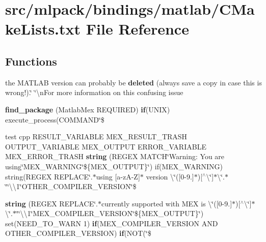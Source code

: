 \section{src/mlpack/bindings/matlab/\+C\+Make\+Lists.txt File Reference}
\label{bindings_2matlab_2CMakeLists_8txt}
\subsection*{Functions}
\begin{DoxyCompactItemize}
\item 
the M\+A\+T\+L\+AB version can probably be {\bf deleted} (always save a copy in case this is wrong!).\char`\"{} \char`\"{}\textbackslash{}n\+For more information on this confusing issue
\item 
{\bf find\+\_\+package} (Matlab\+Mex R\+E\+Q\+U\+I\+R\+ED) {\bf if}(U\+N\+IX) execute\+\_\+process(C\+O\+M\+M\+A\+ND\char`\"{}\$
\item 
test cpp R\+E\+S\+U\+L\+T\+\_\+\+V\+A\+R\+I\+A\+B\+LE M\+E\+X\+\_\+\+R\+E\+S\+U\+L\+T\+\_\+\+T\+R\+A\+SH O\+U\+T\+P\+U\+T\+\_\+\+V\+A\+R\+I\+A\+B\+LE M\+E\+X\+\_\+\+O\+U\+T\+P\+UT E\+R\+R\+O\+R\+\_\+\+V\+A\+R\+I\+A\+B\+LE M\+E\+X\+\_\+\+E\+R\+R\+O\+R\+\_\+\+T\+R\+A\+SH {\bf string} (R\+E\+G\+EX M\+A\+T\+CH\char`\"{}Warning\+: You are using\char`\"{}M\+E\+X\+\_\+\+W\+A\+R\+N\+I\+NG\char`\"{}\$\{M\+E\+X\+\_\+\+O\+U\+T\+P\+UT\}\char`\"{}) if(M\+E\+X\+\_\+\+W\+A\+R\+N\+I\+NG) string(R\+E\+G\+EX R\+E\+P\+L\+A\+CE\char`\"{}.$\ast$using [a-\/zA-\/Z]$\ast$ version \textbackslash{}\char`\"{}([0-\/9.]$\ast$)[$^\wedge$\textbackslash{}\char`\"{}]$\ast$\textbackslash{}\char`\"{}.$\ast$\char`\"{}\char`\"{}\textbackslash{}\textbackslash{}1\char`\"{}O\+T\+H\+E\+R\+\_\+\+C\+O\+M\+P\+I\+L\+E\+R\+\_\+\+V\+E\+R\+S\+I\+ON\char`\"{}\$
\item 
{\bf string} (R\+E\+G\+EX R\+E\+P\+L\+A\+CE\char`\"{}.$\ast$currently supported with M\+EX is \textbackslash{}\char`\"{}([0-\/9.]$\ast$)[$^\wedge$\textbackslash{}\char`\"{}]$\ast$\textbackslash{}\char`\"{}.$\ast$\char`\"{}\char`\"{}\textbackslash{}\textbackslash{}1\char`\"{}M\+E\+X\+\_\+\+C\+O\+M\+P\+I\+L\+E\+R\+\_\+\+V\+E\+R\+S\+I\+ON\char`\"{}\$\{M\+E\+X\+\_\+\+O\+U\+T\+P\+UT\}\char`\"{}) set(N\+E\+E\+D\+\_\+\+T\+O\+\_\+\+W\+A\+RN 1) {\bf if}(M\+E\+X\+\_\+\+C\+O\+M\+P\+I\+L\+E\+R\+\_\+\+V\+E\+R\+S\+I\+ON A\+ND O\+T\+H\+E\+R\+\_\+\+C\+O\+M\+P\+I\+L\+E\+R\+\_\+\+V\+E\+R\+S\+I\+ON) {\bf if}(N\+OT(\char`\"{}\$
\end{DoxyCompactItemize}
